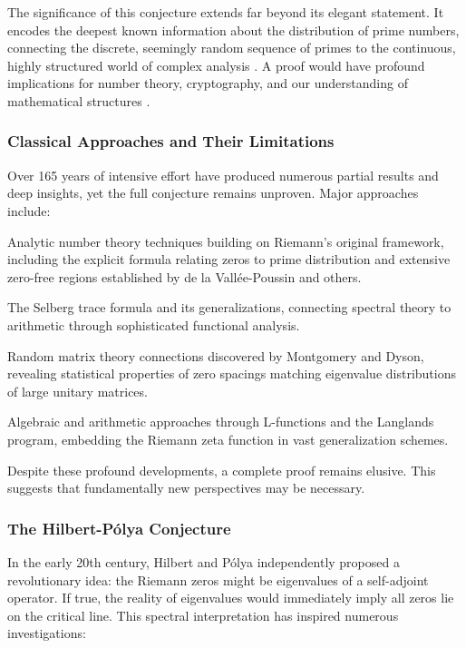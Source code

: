 \documentclass[12pt,letterpaper]{article}
\theoremstyle{plain}
\theoremstyle{definition}
\theoremstyle{remark}
\begin{document}
The significance of this conjecture extends far beyond its elegant statement. It encodes the deepest known information about the distribution of prime numbers, connecting the discrete, seemingly random sequence of primes to the continuous, highly structured world of complex analysis \cite{edwards1974,titchmarsh1986}. A proof would have profound implications for number theory, cryptography, and our understanding of mathematical structures \cite{conrey2003,sarnak2005}.

\subsubsection{Classical Approaches and Their Limitations}

Over 165 years of intensive effort have produced numerous partial results and deep insights, yet the full conjecture remains unproven. Major approaches include:

Analytic number theory techniques building on Riemann's original framework, including the explicit formula relating zeros to prime distribution and extensive zero-free regions established by de la Vallée-Poussin \cite{delavalleepoussin1896} and others.

The Selberg trace formula \cite{selberg1956} and its generalizations, connecting spectral theory to arithmetic through sophisticated functional analysis.

Random matrix theory connections discovered by Montgomery and Dyson, revealing statistical properties of zero spacings matching eigenvalue distributions of large unitary matrices.

Algebraic and arithmetic approaches through L-functions and the Langlands program, embedding the Riemann zeta function in vast generalization schemes.

Despite these profound developments, a complete proof remains elusive. This suggests that fundamentally new perspectives may be necessary.

\subsubsection{The Hilbert-Pólya Conjecture}

In the early 20th century, Hilbert \cite{hilbert1900} and Pólya \cite{polya1927} independently proposed a revolutionary idea: the Riemann zeros might be eigenvalues of a self-adjoint operator. If true, the reality of eigenvalues would immediately imply all zeros lie on the critical line. This spectral interpretation has inspired numerous investigations:
\end{document}
